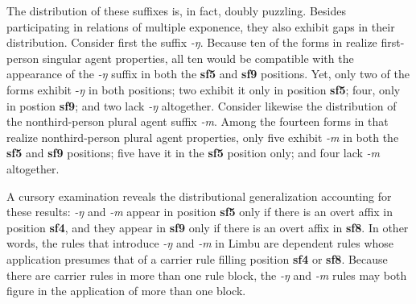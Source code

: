\documentclass[output=paper,
modfonts
]{LSP/langsci}
\begin{document}
The distribution of these suffixes is, in fact, doubly puzzling.  Besides participating in relations of multiple exponence, they also exhibit gaps in their distribution.  Consider first the suffix \textit{\nobreakdash-ŋ}.  Because ten of the forms in  realize first\nobreakdash-person singular agent properties, all ten would be compatible with the appearance of the \textit{\nobreakdash-ŋ} suffix in both the \textbf{sf5} and \textbf{sf9} positions.  Yet, only two of the forms exhibit \nobreakdash-\textit{ŋ} in both positions; two exhibit it only in position \textbf{sf5}; four, only in postion \textbf{sf9}; and two lack \textit{\nobreakdash-ŋ} altogether.  Consider likewise the distribution of the nonthird\nobreakdash-person plural agent suffix \textit{\nobreakdash-m}.  Among the fourteen forms in  that realize nonthird\nobreakdash-person plural agent properties, only five exhibit \textit{\nobreakdash-m} in both the \textbf{sf5} and \textbf{sf9} positions; five have it in the \textbf{sf5} position only; and four lack \textit{\nobreakdash-m} altogether.

A cursory examination reveals the distributional generalization accounting for these results:  \textit{\nobreakdash-ŋ} and \textit{\nobreakdash-m} appear in position \textbf{sf5} only if there is an overt affix in position \textbf{sf4}, and they appear in \textbf{sf9} only if there is an overt affix in \textbf{sf8}.  In other words, the rules that introduce \textit{\nobreakdash-ŋ} and \textit{\nobreakdash-m} in Limbu are dependent rules whose application presumes that of a carrier rule filling position \textbf{sf4} or \textbf{sf8}. Because there are carrier rules in more than one rule block, the \textit{\nobreakdash-ŋ} and \textit{\nobreakdash-m} rules may both figure in the application of more than one block.
\end{document}
